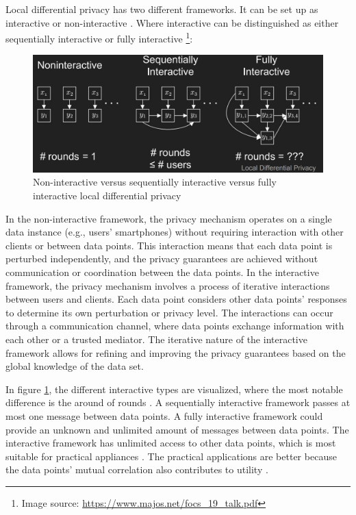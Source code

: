 Local differential privacy has two different frameworks.
It can be set up as interactive or non-interactive \citep{del_rey_comprehensive_2020}.
Where interactive can be distinguished as either sequentially interactive or fully interactive \footnote{Image source: \url{https://www.majos.net/focs_19_talk.pdf}}:
\begin{figure}[H]
  \includegraphics[width=\textwidth]{TheorethicalFramework/nont-interactive-versus-interactive.png}
  \caption{Non-interactive versus sequentially interactive versus fully interactive local differential privacy \citep{joseph_role_2019-1}}
  \label{fig:non-interactive-versus-interactive}
\end{figure}
In the non-interactive framework, the privacy mechanism operates on a single data instance (e.g., users’ smartphones) without requiring interaction with other clients or between data points.
This interaction means that each data point is perturbed independently, and the privacy guarantees are achieved without communication or coordination between the data points.
In the interactive framework, the privacy mechanism involves a process of iterative interactions between users and clients.
Each data point considers other data points' responses to determine its own perturbation or privacy level.
The interactions can occur through a communication channel, where data points exchange information with each other or a trusted mediator.
The iterative nature of the interactive framework allows for refining and improving the privacy guarantees based on the global knowledge of the data set.

In figure \ref{fig:non-interactive-versus-interactive}, the different interactive types are visualized, where the most notable difference is the around of rounds \citep{xiongComprehensiveSurveyLocal2020}.
A sequentially interactive framework passes at most one message between data points.
A fully interactive framework could provide an unknown and unlimited amount of messages between data points.
The interactive framework has unlimited access to other data points, which is most suitable for practical appliances \citep{xiongComprehensiveSurveyLocal2020}.
The practical applications are better because the data points' mutual correlation also contributes to utility \citep{wang_comprehensive_2020}.


